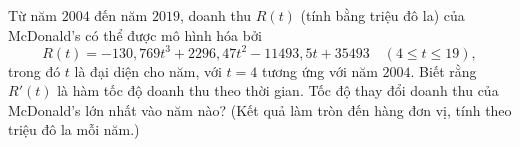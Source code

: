 \begin{ex}
Từ năm $2004$ đến năm $2019$, doanh thu $R(t)$ (tính bằng triệu đô la) của McDonald's có thể được mô hình hóa bởi
\[R(t)=-130{,}769t^3+2296{,}47t^2-11493{,}5t+35493\quad(4\le t\le19),\]
trong đó $t$ là đại diện cho năm, với $t=4$ tương ứng với năm $2004$. Biết rằng $R'(t)$ là hàm tốc độ doanh thu theo thời gian. Tốc độ thay đổi doanh thu của McDonald's lớn nhất vào năm nào? (Kết quả làm tròn đến hàng đơn vị, tính theo triệu đô la mỗi năm.)
\end{ex}
